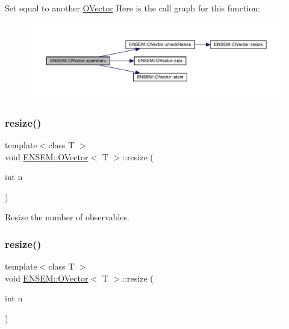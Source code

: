 Set equal to another \mbox{\hyperlink{classENSEM_1_1OVector}{O\+Vector}} Here is the call graph for this function\+:
\nopagebreak
\begin{figure}[H]
\begin{center}
\leavevmode
\includegraphics[width=350pt]{d0/d8d/classENSEM_1_1OVector_a7d5f2f5a6c1dc742f53cc4dabc86722e_cgraph}
\end{center}
\end{figure}
\mbox{\label{classENSEM_1_1OVector_a2758b982bf7fa25b69d31fe8d7f72762}} 
\subsubsection{\texorpdfstring{resize()}{resize()}\hspace{0.1cm}{\footnotesize\ttfamily [1/4]}}
{\footnotesize\ttfamily template$<$class T $>$ \\
void \mbox{\hyperlink{classENSEM_1_1OVector}{E\+N\+S\+E\+M\+::\+O\+Vector}}$<$ T $>$\+::resize (\begin{DoxyParamCaption}\item[{int}]{n }\end{DoxyParamCaption})\hspace{0.3cm}{\ttfamily [inline]}}



Resize the number of observables. 

\mbox{\label{classENSEM_1_1OVector_a2758b982bf7fa25b69d31fe8d7f72762}} 
\subsubsection{\texorpdfstring{resize()}{resize()}\hspace{0.1cm}{\footnotesize\ttfamily [2/4]}}
{\footnotesize\ttfamily template$<$class T $>$ \\
void \mbox{\hyperlink{classENSEM_1_1OVector}{E\+N\+S\+E\+M\+::\+O\+Vector}}$<$ T $>$\+::resize (\begin{DoxyParamCaption}\item[{int}]{n }\end{DoxyParamCaption})\hspace{0.3cm}{\ttfamily [inline]}}



